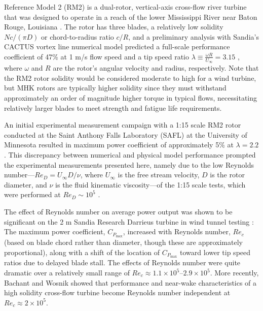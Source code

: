 \documentclass[10pt,letterpaper]{article}
\begin{document}
Reference Model 2 (RM2) is a dual-rotor, vertical-axis cross-flow river turbine
that was designed to operate in a reach of the lower Mississippi River near
Baton Rouge, Louisiana \cite{Barone2011, Neary2011}. The rotor has three blades,
a relatively low solidity $Nc/(\pi D)$ or chord-to-radius ratio $c/R$, and a
preliminary analysis with Sandia's CACTUS vortex line numerical model
\cite{Murray2011} predicted a full-scale performance coefficient of 47\% at 1
m/s flow speed and a tip speed ratio $\lambda \equiv \frac{\omega R}{U_\infty} =
3.15$ \cite{Barone2011}, where $\omega$ and $R$ are the rotor's angular velocity
and radius, respectively. Note that the RM2 rotor solidity would be considered
moderate to high for a wind turbine, but MHK rotors are typically higher
solidity since they must withstand approximately an order of magnitude higher
torque in typical flows, necessitating relatively larger blades to meet strength
and fatigue life requirements.

An initial experimental measurement campaign with a 1:15 scale RM2 rotor
conducted at the Saint Anthony Falls Laboratory (SAFL) at the University of
Minnesota resulted in maximum power coefficient of approximately 5\% at $\lambda
= 2.2$. This discrepancy between numerical and physical model performance
prompted the experimental measurements presented here, namely due to the low
Reynolds number---$Re_D = U_\infty D / \nu$, where $U_\infty$ is the free stream
velocity, $D$ is the rotor diameter, and $\nu$ is the fluid kinematic
viscosity---of the 1:15 scale tests, which were performed at $Re_D \sim 10^5$
\cite{Hill2014}.

The effect of Reynolds number on average power output was shown to be
significant on the 2 m Sandia Research Darrieus turbine in wind tunnel testing
\cite{Blackwell1976}: The maximum power coefficient, $C_{P_{\max}}$, increased
with Reynolds number, $Re_c$ (based on blade chord rather than diameter, though
these are approximately proportional), along with a shift of the location of
$C_{P_{\max}}$ toward lower tip speed ratios due to delayed blade stall. The
effects of Reynolds number were quite dramatic over a relatively small range of
$Re_c \approx 1.1 \times 10^5$--$2.9 \times 10^5$. More recently, Bachant and
Wosnik \cite{Bachant2014, Bachant2016-RVAT-Re-dep} showed that performance and
near-wake characteristics of a high solidity cross-flow turbine become Reynolds
number independent at $Re_c \approx 2 \times 10^5$.
\end{document}
